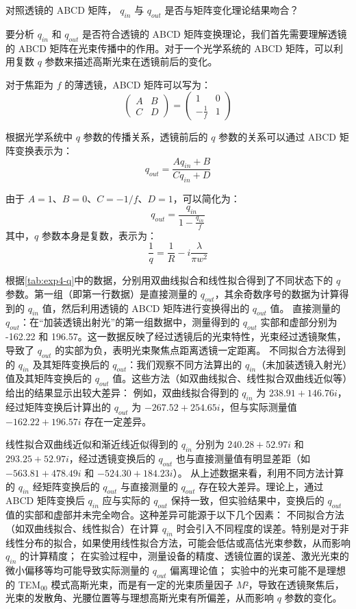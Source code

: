 \begin{question}
	对照透镜的 ABCD 矩阵， $q_{in}$ 与 $q_{out}$ 是否与矩阵变化理论结果吻合？
\end{question}
要分析 \( q_{in} \) 和 \( q_{out} \) 是否符合透镜的 ABCD 矩阵变换理论，我们首先需要理解透镜的 ABCD 矩阵在光束传播中的作用。对于一个光学系统的 ABCD 矩阵，可以利用复数 \( q \) 参数来描述高斯光束在透镜前后的变化。

对于焦距为 \( f \) 的薄透镜，ABCD 矩阵可以写为：
\[
\begin{pmatrix}
	A & B \\
	C & D
\end{pmatrix}
= 
\begin{pmatrix}
	1 & 0 \\
	-\frac{1}{f} & 1
\end{pmatrix}
\]

根据光学系统中 \( q \) 参数的传播关系，透镜前后的 \( q \) 参数的关系可以通过 ABCD 矩阵变换表示为：
\[
q_{out} = \frac{A q_{in} + B}{C q_{in} + D}
\]

由于 \( A = 1 \)、\( B = 0 \)、\( C = -1/f \)、\( D = 1 \)，可以简化为：
\[
q_{out} = \frac{q_{in}}{1 - \frac{q_{in}}{f}}
\]
其中，\( q \) 参数本身是复数，表示为：
\[
\frac{1}{q} = \frac{1}{R} - i\frac{\lambda}{\pi w^2}
\]

根据\cref{tab:exp4-q}中的数据，分别用双曲线拟合和线性拟合得到了不同状态下的 \( q \) 参数。第一组（即第一行数据）是直接测量的 \( q_{out} \)，其余奇数序号的数据为计算得到的 \( q_{in} \) 值，然后利用透镜的 ABCD 矩阵进行变换得出的 \( q_{out} \) 值。
直接测量的 \( q_{out} \)：在“加装透镜出射光”的第一组数据中，测量得到的 \( q_{out} \) 实部和虚部分别为 -162.22 和 196.57。这一数据反映了经过透镜后的光束特性，光束经过透镜聚焦，导致了 \( q_{out} \) 的实部为负，表明光束聚焦点距离透镜一定距离。
不同拟合方法得到的 \( q_{in} \) 及其矩阵变换后的 \( q_{out} \)：我们观察不同方法算出的 \( q_{in} \)（未加装透镜入射光）值及其矩阵变换后的 \( q_{out} \) 值。这些方法（如双曲线拟合、线性拟合双曲线近似等）给出的结果显示出较大差异：
例如，双曲线拟合得到的 \( q_{in} \) 为 \( 238.91 + 146.76i \)，经过矩阵变换后计算出的 \( q_{out} \) 为 \( -267.52 + 254.65i \)，但与实际测量值 \( -162.22 + 196.57i \) 存在一定差异。

线性拟合双曲线近似和渐近线近似得到的 \( q_{in} \) 分别为 \( 240.28 + 52.97i \) 和 \( 293.25 + 52.97i \)，经过透镜变换后的 \( q_{out} \) 也与直接测量值有明显差距（如 \( -563.81 + 478.49i \) 和 \( -524.30 + 184.23i \)）。
从上述数据来看，利用不同方法计算的 \( q_{in} \) 经矩阵变换后的 \( q_{out} \) 与直接测量的 \( q_{out} \) 存在较大差异。理论上，通过 ABCD 矩阵变换后 \( q_{in} \) 应与实际的 \( q_{out} \) 保持一致，但实验结果中，变换后的 \( q_{out} \) 值的实部和虚部并未完全吻合。这种差异可能源于以下几个因素：
不同拟合方法（如双曲线拟合、线性拟合）在计算 \( q_{in} \) 时会引入不同程度的误差。特别是对于非线性分布的拟合，如果使用线性拟合方法，可能会低估或高估光束参数，从而影响 \( q_{in} \) 的计算精度；
在实验过程中，测量设备的精度、透镜位置的误差、激光光束的微小偏移等均可能导致实际测量的 \( q_{out} \) 偏离理论值；
实验中的光束可能不是理想的 TEM\(_{00}\) 模式高斯光束，而是有一定的光束质量因子 \( M² \)，导致在透镜聚焦后，光束的发散角、光腰位置等与理想高斯光束有所偏差，从而影响 \( q \) 参数的变化。

